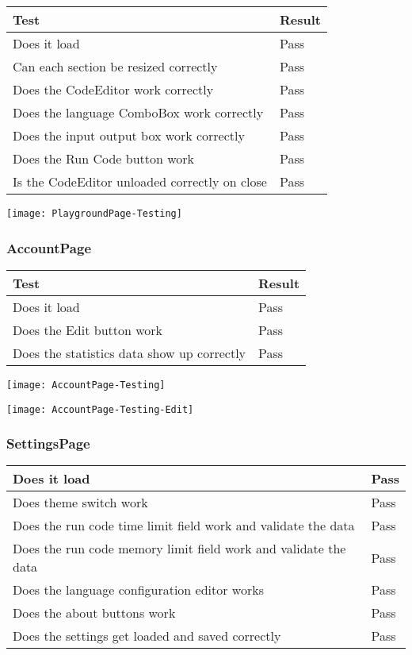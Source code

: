 \documentclass[report.tex]{subfiles}
\begin{document}
\begin{tabulary}{\linewidth}{|L|l|}
    \hline
    Test & Result \\
    \hline
    Does it load & Pass \\
    \hline
    Can each section be resized correctly & Pass \\
    \hline
    Does the CodeEditor work correctly & Pass \\
    \hline
    Does the language ComboBox work correctly & Pass \\
    \hline
    Does the input output box work correctly & Pass \\
    \hline
    Does the Run Code button work & Pass \\
    \hline
    Is the CodeEditor unloaded correctly on close & Pass \\
    \hline
\end{tabulary}

\texttt{[image: PlaygroundPage-Testing]}


\subsubsection{AccountPage}

\begin{tabulary}{\linewidth}{|L|l|}
    \hline
    Test & Result\\
    \hline
    Does it load & Pass \\
    \hline
    Does the Edit button work & Pass \\
    \hline
    Does the statistics data show up correctly & Pass \\
    \hline
\end{tabulary}

\texttt{[image: AccountPage-Testing]}

\texttt{[image: AccountPage-Testing-Edit]}

\subsubsection{SettingsPage}

\begin{tabulary}{\linewidth}{|L|l|}
    \hline
    Does it load & Pass \\
    \hline
    Does theme switch work & Pass \\
    \hline
    Does the run code time limit field work and validate the data & Pass \\
    \hline
    Does the run code memory limit field work and validate the data & Pass \\
    \hline
    Does the language configuration editor works & Pass \\
    \hline
    Does the about buttons work & Pass \\
    \hline
    Does the settings get loaded and saved correctly & Pass \\
    \hline
\end{tabulary}
\end{document}
